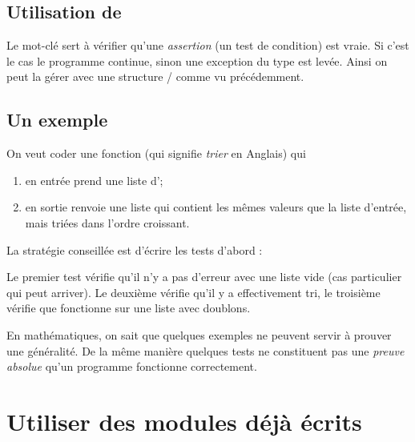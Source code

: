 \documentclass[a4paper,12pt,french]{book}
\begin{document}
\subsection{Utilisation de }

Le mot-clé  sert à vérifier qu'une \textit{assertion} (un test de condition) est vraie. Si c'est le cas le programme continue, sinon une exception du type  est levée. Ainsi on peut la gérer avec une structure  /  comme vu précédemment.

\subsection{Un exemple}

On veut coder une fonction  (qui signifie \textit{trier} en Anglais) qui 
\begin{enumerate}[--]
	\item 	en entrée prend une liste d';
	\item 	en sortie renvoie une liste qui contient les mêmes valeurs que la liste d'entrée, mais triées dans l'ordre croissant.	
\end{enumerate}

La stratégie conseillée est d'écrire les tests d'abord :


Le premier test vérifie qu'il n'y a pas d'erreur avec une liste vide (cas particulier qui peut arriver). Le deuxième vérifie qu'il y a effectivement tri, le troisième vérifie que  fonctionne sur une liste avec doublons.

\begin{attention}
	En mathématiques, on sait que \og quelques exemples ne peuvent servir à prouver une généralité\fg. De la même manière quelques tests ne constituent pas une \textit{preuve absolue} qu'un programme fonctionne correctement.
\end{attention}

\section{Utiliser des modules déjà écrits}
\end{document}
